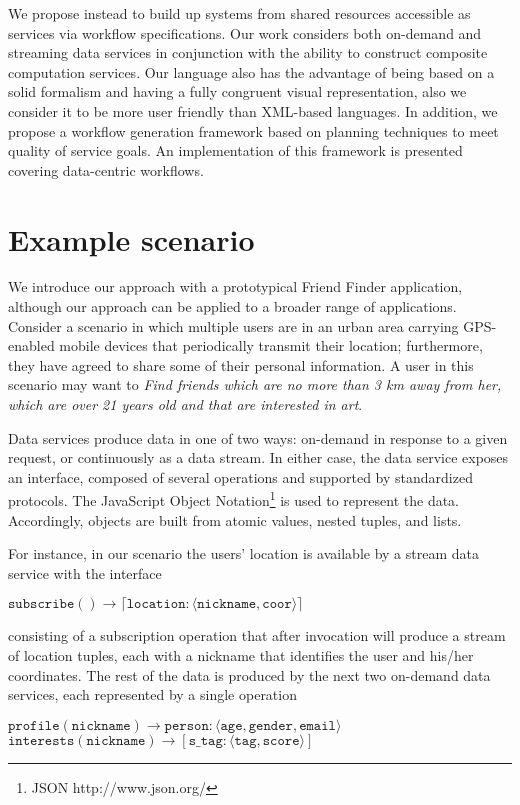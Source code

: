 \documentclass{acm_proc_article-sp}
\begin{document}
We propose instead to build up systems from shared resources accessible as services via workflow specifications. Our work considers both on-demand and streaming data services in conjunction with the ability to construct composite computation services. Our language also has the advantage of being based on a solid formalism and having a fully congruent visual representation, also we consider it to be more user friendly than XML-based languages. In addition, we propose a workflow generation framework based on planning techniques to meet quality of service goals. An implementation of this framework is presented covering data-centric workflows.
	
\section{Example scenario}\label{sec:asasel:example}

We introduce our approach with a prototypical Friend Finder application, although our approach can be applied to a broader range of applications. Consider a scenario in which multiple users are in an urban area carrying GPS-enabled mobile devices that periodically transmit their location; furthermore, they have agreed to share some of their personal information. A user in this scenario may want to \textit{Find friends which are no more than 3 km away from her, which are over 21 years old and that are interested in art}.
		
Data services produce data in one of two ways: on-demand in response to a given request, or continuously as a data stream. In either case, the data service exposes an interface, composed of several operations and supported by standardized protocols. The JavaScript Object Notation\footnote{JSON http://www.json.org/} is used to represent the data. Accordingly, objects are built from atomic values, nested tuples, and lists.
	
For instance, in our scenario the users' location is available by a stream data service with the interface
	
$\mathtt{subscribe() \rightarrow \lceil location:\langle nickname, coor\rangle\rceil}$
	
consisting of a subscription operation that after invocation will produce a stream of location tuples, each with a nickname that identifies the user and his/her coordinates. The rest of the data is produced by the next two on-demand data services, each represented by a single operation
	
$\mathtt{profile(nickname) \rightarrow person:\langle age, gender, email\rangle}$
\\
$\mathtt{interests(nickname) \rightarrow \left[s\_tag:\langle tag, score\rangle\right]}$
	
\end{document}
